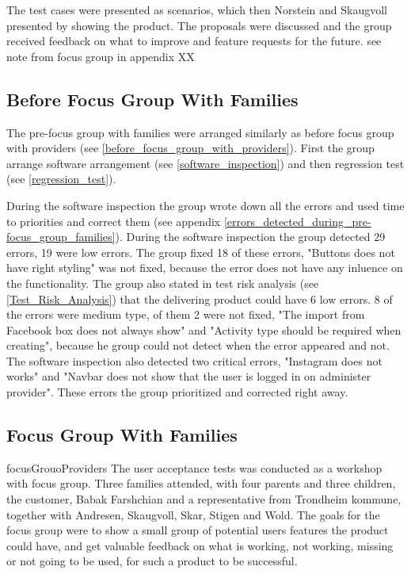 The test cases were presented as scenarios, which then Norstein and Skaugvoll presented by showing the product. The proposals were discussed and the group received feedback on what to improve and feature requests for the future. see note from focus group in appendix XX


\subsection{Before Focus Group With Families}
\label{before_focus_group_with_families}
The pre-focus group with families were arranged similarly as before focus group with providers (see \ref{before_focus_group_with_providers}). First the group arrange software arrangement (see \ref{software_inspection}) and then regression test (see \ref{regression_test}). 

During the software inspection the group wrote down all the errors and used time to priorities and correct them (see appendix \ref{errors_detected_during_pre-focus_group_families}). During the software inspection the group detected 29 errors, 19 were low errors. The group fixed 18 of these errors, "Buttons does not have right styling" was not fixed, because the error does not have any inluence on the functionality. The group also stated in test risk analysis (see \ref{Test_Risk_Analysis}) that the delivering product could have 6 low errors. 8 of the errors were medium type, of them 2 were not fixed, "The import from Facebook box does not always show" and  "Activity type should be required when creating", because he group could not detect when the error appeared and not. The software inspection also detected two critical errors, "Instagram does not works" and "Navbar does not show that the user is logged in on administer provider". These errors the group prioritized and corrected right away.


\subsection{Focus Group With Families}
\label{focusGroup}focusGrouoProviders
The user acceptance tests was conducted as a workshop with focus group. Three families attended, with four parents and three children, the customer, Babak Farshchian and a representative from Trondheim kommune, together with Andresen, Skaugvoll, Skar, Stigen and Wold.  The goals for the focus group were to show a small group of potential users features the product could have, and get valuable feedback on what is working, not working, missing or not going to be used, for such a product to be successful.

